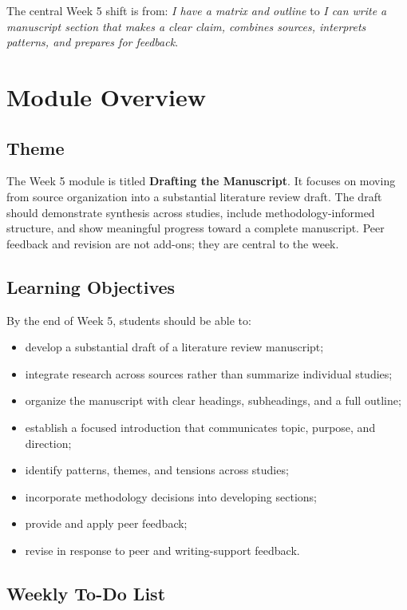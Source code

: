 \documentclass[10pt,letterpaper]{article}
\begin{document}
The central Week 5 shift is from: \emph{I have a matrix and outline} to \emph{I can write a manuscript section that makes a clear claim, combines sources, interprets patterns, and prepares for feedback}.

\section{Module Overview}

\subsection{Theme}

The Week 5 module is titled \textbf{Drafting the Manuscript}. It focuses on moving from source organization into a substantial literature review draft. The draft should demonstrate synthesis across studies, include methodology-informed structure, and show meaningful progress toward a complete manuscript. Peer feedback and revision are not add-ons; they are central to the week.

\subsection{Learning Objectives}

By the end of Week 5, students should be able to:

\begin{itemize}
\item develop a substantial draft of a literature review manuscript;
\item integrate research across sources rather than summarize individual studies;
\item organize the manuscript with clear headings, subheadings, and a full outline;
\item establish a focused introduction that communicates topic, purpose, and direction;
\item identify patterns, themes, and tensions across studies;
\item incorporate methodology decisions into developing sections;
\item provide and apply peer feedback;
\item revise in response to peer and writing-support feedback.
\end{itemize}

\subsection{Weekly To-Do List}
\end{document}
